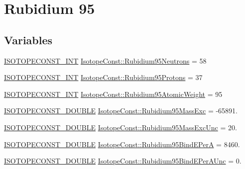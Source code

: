 \hypertarget{group___isotope_const-_rubidium-_rb95}{}\section{Rubidium 95}
\label{group___isotope_const-_rubidium-_rb95}
\subsection*{Variables}
\begin{DoxyCompactItemize}
\item 
\mbox{\hyperlink{group___isotope_const-_macros_ga5f18360b3e99483a35c32d789e62621c}{I\+S\+O\+T\+O\+P\+E\+C\+O\+N\+S\+T\+\_\+\+I\+NT}} \mbox{\hyperlink{group___isotope_const-_rubidium-_rb95_gaf55ac3f32ed850603f370bcfdb8cc571}{Isotope\+Const\+::\+Rubidium95\+Neutrons}} = 58
\item 
\mbox{\hyperlink{group___isotope_const-_macros_ga5f18360b3e99483a35c32d789e62621c}{I\+S\+O\+T\+O\+P\+E\+C\+O\+N\+S\+T\+\_\+\+I\+NT}} \mbox{\hyperlink{group___isotope_const-_rubidium-_rb95_gac7184b9aa107449f23c75b0db38c2978}{Isotope\+Const\+::\+Rubidium95\+Protons}} = 37
\item 
\mbox{\hyperlink{group___isotope_const-_macros_ga5f18360b3e99483a35c32d789e62621c}{I\+S\+O\+T\+O\+P\+E\+C\+O\+N\+S\+T\+\_\+\+I\+NT}} \mbox{\hyperlink{group___isotope_const-_rubidium-_rb95_ga13a4e81438dfa419676801e1a81efc32}{Isotope\+Const\+::\+Rubidium95\+Atomic\+Weight}} = 95
\item 
\mbox{\hyperlink{group___isotope_const-_macros_ga8f45a7272ce02c0b4c65c44636ed719a}{I\+S\+O\+T\+O\+P\+E\+C\+O\+N\+S\+T\+\_\+\+D\+O\+U\+B\+LE}} \mbox{\hyperlink{group___isotope_const-_rubidium-_rb95_ga83ce41cdf1b41aaecad617a9510f7fea}{Isotope\+Const\+::\+Rubidium95\+Mass\+Exc}} = -\/65891.
\item 
\mbox{\hyperlink{group___isotope_const-_macros_ga8f45a7272ce02c0b4c65c44636ed719a}{I\+S\+O\+T\+O\+P\+E\+C\+O\+N\+S\+T\+\_\+\+D\+O\+U\+B\+LE}} \mbox{\hyperlink{group___isotope_const-_rubidium-_rb95_ga01c10be9b610effecc6bc4a87b91ab02}{Isotope\+Const\+::\+Rubidium95\+Mass\+Exc\+Unc}} = 20.
\item 
\mbox{\hyperlink{group___isotope_const-_macros_ga8f45a7272ce02c0b4c65c44636ed719a}{I\+S\+O\+T\+O\+P\+E\+C\+O\+N\+S\+T\+\_\+\+D\+O\+U\+B\+LE}} \mbox{\hyperlink{group___isotope_const-_rubidium-_rb95_ga32596d325d6419851a57f6ea19570654}{Isotope\+Const\+::\+Rubidium95\+Bind\+E\+PerA}} = 8460.
\item 
\mbox{\hyperlink{group___isotope_const-_macros_ga8f45a7272ce02c0b4c65c44636ed719a}{I\+S\+O\+T\+O\+P\+E\+C\+O\+N\+S\+T\+\_\+\+D\+O\+U\+B\+LE}} \mbox{\hyperlink{group___isotope_const-_rubidium-_rb95_gae4656afc4d9fa8caacfdecb71e8900fe}{Isotope\+Const\+::\+Rubidium95\+Bind\+E\+Per\+A\+Unc}} = 0.

\end{DoxyCompactItemize}
